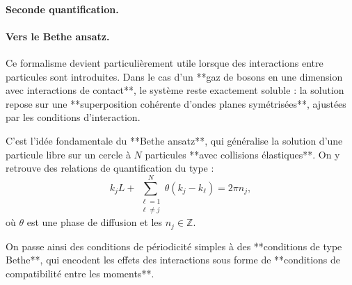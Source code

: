 {\color{blue} \paragraph{Seconde quantification.}



\paragraph{Vers le Bethe ansatz.}

Ce formalisme devient particulièrement utile lorsque des interactions entre particules sont introduites. Dans le cas d’un **gaz de bosons en une dimension avec interactions de contact**, le système reste exactement soluble : la solution repose sur une **superposition cohérente d’ondes planes symétrisées**, ajustées par les conditions d’interaction.

C’est l’idée fondamentale du **Bethe ansatz**, qui généralise la solution d’une particule libre sur un cercle à $N$ particules **avec collisions élastiques**. On y retrouve des relations de quantification du type :
\begin{equation}
k_j L + \sum_{\substack{\ell=1 \\ \ell \neq j}}^N \theta(k_j - k_\ell) = 2\pi n_j,
\end{equation}
où $\theta$ est une phase de diffusion et les $n_j \in \mathbb{Z}$.

On passe ainsi des conditions de périodicité simples à des **conditions de type Bethe**, qui encodent les effets des interactions sous forme de **conditions de compatibilité entre les moments**.

}

